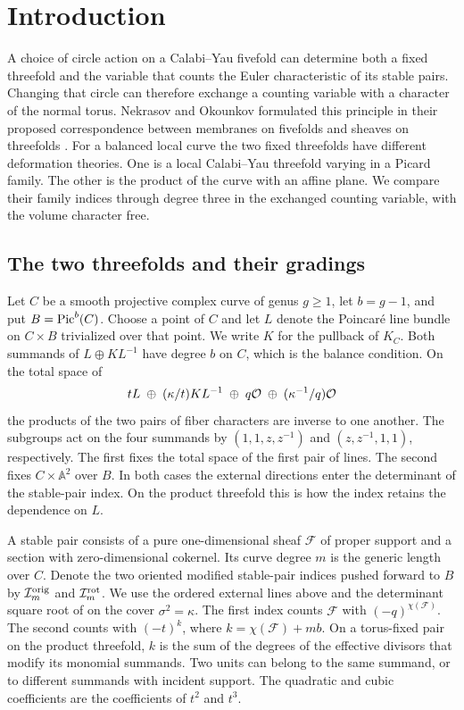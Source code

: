 \section{Introduction}\label{sec:intro}

A choice of circle action on a Calabi--Yau fivefold can determine both a fixed threefold and the variable that counts the Euler characteristic of its stable pairs. Changing that circle can therefore exchange a counting variable with a character of the normal torus. Nekrasov and Okounkov formulated this principle in their proposed correspondence between membranes on fivefolds and sheaves on threefolds \cite[\S\S 1--2]{NO}. For a balanced local curve the two fixed threefolds have different deformation theories. One is a local Calabi--Yau threefold varying in a Picard family. The other is the product of the curve with an affine plane. We compare their family indices through degree three in the exchanged counting variable, with the volume character free.

\subsection{The two threefolds and their gradings}
Let $C$ be a smooth projective complex curve of genus $g\geq 1$, let $b=g-1$, and put $B=\operatorname{Pic}^b(C)$. Choose a point of $C$ and let $L$ denote the Poincar\'e line bundle on $C\times B$ trivialized over that point. We write $K$ for the pullback of $K_C$. Both summands of $L\oplus K L^{-1}$ have degree $b$ on $C$, which is the balance condition. On the total space of
\[
         tL\;\oplus\;(\kappa/t)K L^{-1}
             \;\oplus\;q\mathcal O\;\oplus\;(\kappa^{-1}/q)\mathcal O
\]
the products of the two pairs of fiber characters are inverse to one another. The subgroups act on the four summands by $(1,1,z,z^{-1})$ and $(z,z^{-1},1,1)$, respectively. The first fixes the total space of the first pair of lines. The second fixes $C\times\mathbb A^2$ over $B$. In both cases the external directions enter the determinant of the stable-pair index. On the product threefold this is how the index retains the dependence on $L$.

A stable pair consists of a pure one-dimensional sheaf $\mathcal F$ of proper support and a section with zero-dimensional cokernel. Its curve degree $m$ is the generic length over $C$. Denote the two oriented modified stable-pair indices pushed forward to $B$ by $\mathcal I_m^{\rm orig}$ and $\mathcal I_m^{\rm rot}$. We use the ordered external lines above and the determinant square root of \cite[Lemma~2.1]{W1} on the cover $\sigma^2=\kappa$. The first index counts $\mathcal F$ with $(-q)^{\chi(\mathcal F)}$. The second counts with $(-t)^k$, where $k=\chi(\mathcal F)+mb$. On a torus-fixed pair on the product threefold, $k$ is the sum of the degrees of the effective divisors that modify its monomial summands. Two units can belong to the same summand, or to different summands with incident support. The quadratic and cubic coefficients are the coefficients of $t^2$ and $t^3$.

